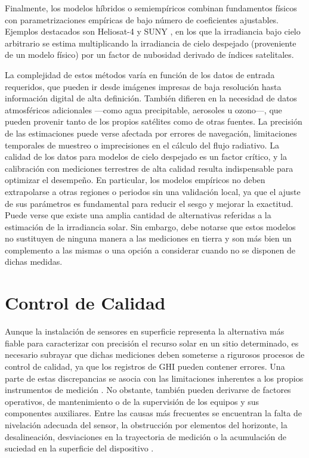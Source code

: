 Finalmente, los modelos híbridos o semiempíricos combinan fundamentos físicos con parametrizaciones empíricas de bajo número de coeficientes ajustables. Ejemplos destacados son Heliosat-4 \cite{qu2017} y SUNY \cite{Perez2002}, en los que la irradiancia bajo cielo arbitrario se estima multiplicando la irradiancia de cielo despejado (proveniente de un modelo físico) por un factor de nubosidad derivado de índices satelitales.

La complejidad de estos métodos varía en función de los datos de entrada requeridos, que pueden ir desde imágenes impresas de baja resolución hasta información digital de alta definición. También difieren en la necesidad de datos atmosféricos adicionales —como agua precipitable, aerosoles u ozono—, que pueden provenir tanto de los propios satélites como de otras fuentes. La precisión de las estimaciones puede verse afectada por errores de navegación, limitaciones temporales de muestreo o imprecisiones en el cálculo del flujo radiativo. La calidad de los datos para modelos de cielo despejado es un factor crítico, y la calibración con mediciones terrestres de alta calidad resulta indispensable para optimizar el desempeño. En particular, los modelos empíricos no deben extrapolarse a otras regiones o periodos sin una validación local, ya que el ajuste de sus parámetros es fundamental para reducir el sesgo y mejorar la exactitud.\\




Puede verse que existe una amplia cantidad de alternativas referidas a la estimación de la irradiancia solar. Sin embargo, debe notarse que estos modelos no sustituyen de ninguna manera a las mediciones en tierra y son más bien un complemento a las mismas o una opción a considerar cuando no se disponen de dichas medidas. 


\section{Control de Calidad}
Aunque la instalación de sensores en superficie representa la alternativa más fiable para caracterizar con precisión el recurso solar en un sitio determinado, es necesario subrayar que dichas mediciones deben someterse a rigurosos procesos de control de calidad, ya que los registros de GHI pueden contener errores. Una parte de estas discrepancias se asocia con las limitaciones inherentes a los propios instrumentos de medición \citep{Vignola2019,Gueymard2009,Sengupta2024}. No obstante, también pueden derivarse de factores operativos, de mantenimiento o de la supervisión de los equipos y sus componentes auxiliares. Entre las causas más frecuentes se encuentran la falta de nivelación adecuada del sensor, la obstrucción por elementos del horizonte, la desalineación, desviaciones en la trayectoria de medición o la acumulación de suciedad en la superficie del dispositivo \citep{Moreno2016, Shi2008}.\\

